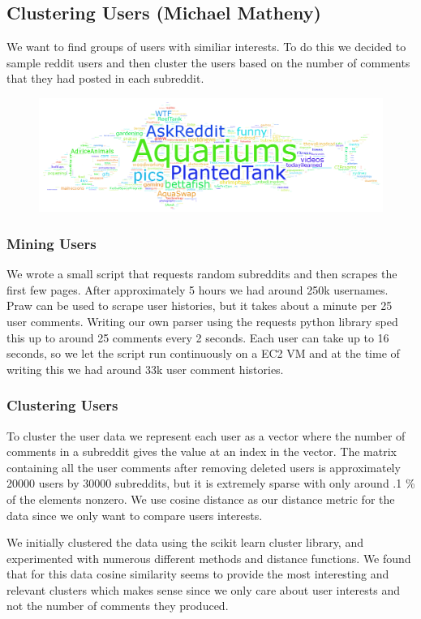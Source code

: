 \documentclass[12pt]{article}
\numberwithin{equation}{section}
\begin{document}
\subsection*{Clustering Users (Michael Matheny)}
We want to find groups of users with similiar interests. To do this we decided to sample reddit users and then cluster the users based on the number of comments that they had posted in each subreddit. 
\begin{figure}[h!]
	\includegraphics[scale=.4]{fish_94.png}
\end{figure}

\subsubsection*{Mining Users}
 We wrote a small script that requests random subreddits and then scrapes the first few pages. After approximately 5 hours we had around 250k usernames. Praw can be used to scrape user histories, but it takes about a minute per 25 user comments. 
 Writing our own parser using the requests python library sped this up to around 25 comments every 2 seconds. Each user can take up to 16 seconds, so we let the script run continuously on a EC2 VM and at the time of writing this we had 
 around 33k user comment histories. 
\subsubsection*{Clustering Users}
To cluster the user data we represent each user as a vector where the number of comments in a subreddit gives 
the value at an index in the vector. The matrix containing all the user comments after removing 
deleted users is approximately 20000 users by 30000 subreddits, but it is extremely sparse with only around .1 \%
of the elements nonzero. 
We use cosine distance as our distance metric for the data since we only want to compare users interests. 

We initially clustered the data using the scikit learn cluster library, and experimented with numerous different 
methods and distance functions. We found that for this data cosine similarity seems to provide the most interesting 
and relevant clusters which makes sense since we only care about user interests and not the number of comments 
they produced.
\end{document}
